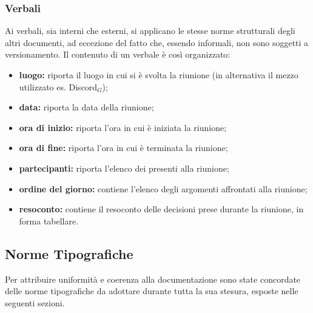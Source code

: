 \subsubsection{Verbali}\label{ProcessiDiSupportoDocumentazioneStrutturaGeneraleDeiDocumentiVerbali}
Ai verbali, sia interni che esterni, si applicano le stesse norme strutturali degli altri documenti, ad eccezione del fatto che, essendo informali, non sono soggetti a versionamento. Il contenuto di un verbale è così organizzato:
\begin{itemize}
\item \textbf{luogo:} riporta il luogo in cui si è svolta la riunione (in alternativa il mezzo utilizzato es. Discord$_G$);
	\item \textbf{data:} riporta la data della riunione;
		\item \textbf{ora di inizio:} riporta l'ora in cui è iniziata la riunione;
			\item \textbf{ora di fine:} riporta l'ora in cui è terminata la riunione;
				\item \textbf{partecipanti:} riporta l'elenco dei presenti alla riunione;
					\item \textbf{ordine del giorno:} contiene l'elenco degli argomenti affrontati alla riunione;
						\item \textbf{resoconto:}  contiene il resoconto delle decisioni prese durante la riunione, in forma tabellare.
\end{itemize}
\subsection{Norme Tipografiche}\label{ProcessiDiSupportoDocumentazioneNormeTipografiche}
\label{sec:NormeTipografiche}
Per attribuire uniformità e coerenza alla documentazione sono state concordate  delle norme tipografiche da adottare durante tutta la sua stesura, esposte nelle seguenti sezioni.
